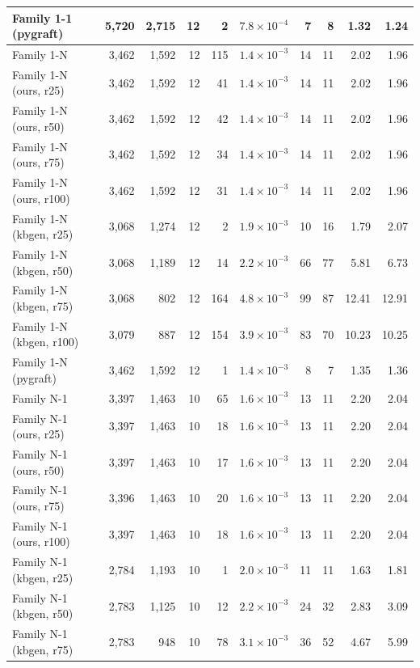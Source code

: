 \begin{tabular}{lrrrrrrrrr}
Family 1-1 (pygraft) & 5{,}720 & 2{,}715 & 12 & 2 & $7.8\times10^{-4}$ & 7 & 8 & 1.32 & 1.24 \\
\midrule
Family 1-N & 3{,}462 & 1{,}592 & 12 & 115 & $1.4\times10^{-3}$ & 14 & 11 & 2.02 & 1.96 \\
Family 1-N (ours, r25) & 3{,}462 & 1{,}592 & 12 & 41 & $1.4\times10^{-3}$ & 14 & 11 & 2.02 & 1.96 \\
Family 1-N (ours, r50) & 3{,}462 & 1{,}592 & 12 & 42 & $1.4\times10^{-3}$ & 14 & 11 & 2.02 & 1.96 \\
Family 1-N (ours, r75) & 3{,}462 & 1{,}592 & 12 & 34 & $1.4\times10^{-3}$ & 14 & 11 & 2.02 & 1.96 \\
Family 1-N (ours, r100) & 3{,}462 & 1{,}592 & 12 & 31 & $1.4\times10^{-3}$ & 14 & 11 & 2.02 & 1.96 \\
Family 1-N (kbgen, r25) & 3{,}068 & 1{,}274 & 12 & 2 & $1.9\times10^{-3}$ & 10 & 16 & 1.79 & 2.07 \\
Family 1-N (kbgen, r50) & 3{,}068 & 1{,}189 & 12 & 14 & $2.2\times10^{-3}$ & 66 & 77 & 5.81 & 6.73 \\
Family 1-N (kbgen, r75) & 3{,}068 & 802 & 12 & 164 & $4.8\times10^{-3}$ & 99 & 87 & 12.41 & 12.91 \\
Family 1-N (kbgen, r100) & 3{,}079 & 887 & 12 & 154 & $3.9\times10^{-3}$ & 83 & 70 & 10.23 & 10.25 \\
Family 1-N (pygraft) & 3{,}462 & 1{,}592 & 12 & 1 & $1.4\times10^{-3}$ & 8 & 7 & 1.35 & 1.36 \\
\midrule
Family N-1 & 3{,}397 & 1{,}463 & 10 & 65 & $1.6\times10^{-3}$ & 13 & 11 & 2.20 & 2.04 \\
Family N-1 (ours, r25) & 3{,}397 & 1{,}463 & 10 & 18 & $1.6\times10^{-3}$ & 13 & 11 & 2.20 & 2.04 \\
Family N-1 (ours, r50) & 3{,}397 & 1{,}463 & 10 & 17 & $1.6\times10^{-3}$ & 13 & 11 & 2.20 & 2.04 \\
Family N-1 (ours, r75) & 3{,}396 & 1{,}463 & 10 & 20 & $1.6\times10^{-3}$ & 13 & 11 & 2.20 & 2.04 \\
Family N-1 (ours, r100) & 3{,}397 & 1{,}463 & 10 & 18 & $1.6\times10^{-3}$ & 13 & 11 & 2.20 & 2.04 \\
Family N-1 (kbgen, r25) & 2{,}784 & 1{,}193 & 10 & 1 & $2.0\times10^{-3}$ & 11 & 11 & 1.63 & 1.81 \\
Family N-1 (kbgen, r50) & 2{,}783 & 1{,}125 & 10 & 12 & $2.2\times10^{-3}$ & 24 & 32 & 2.83 & 3.09 \\
Family N-1 (kbgen, r75) & 2{,}783 & 948 & 10 & 78 & $3.1\times10^{-3}$ & 36 & 52 & 4.67 & 5.99 \\

\end{tabular}
